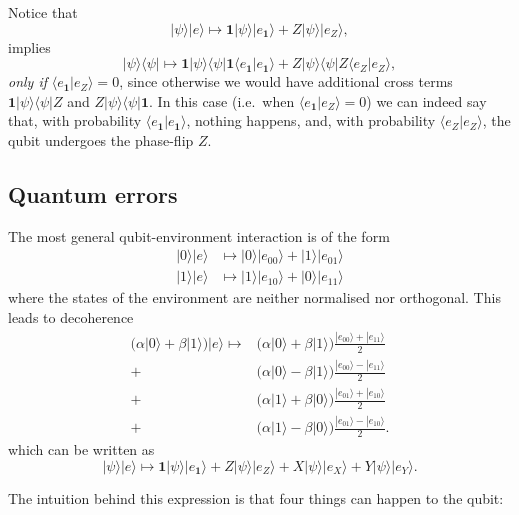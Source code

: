 \documentclass[fleqn]{article}
\begin{document}
Notice that
\[
|\psi\rangle|e\rangle \longmapsto \mathbf{1}|\psi\rangle|e_{\mathbf{1}}\rangle+Z|\psi\rangle|e_Z\rangle,
\]
implies
\[
|\psi\rangle\langle\psi|\longmapsto \mathbf{1}|\psi\rangle\langle\psi| \mathbf{1}\langle e_{\mathbf{1}}|e_{\mathbf{1}}\rangle +Z|\psi\rangle\langle\psi| Z\langle e_Z|e_Z\rangle,
\]
\emph{only if} \(\langle e_{\mathbf{1}}|e_Z\rangle=0\), since otherwise we would have additional cross terms \(\mathbf{1}|\psi\rangle\langle\psi|Z\) and \(Z|\psi\rangle\langle\psi|\mathbf{1}\).
In this case (i.e.~when \(\langle e_{\mathbf{1}}|e_Z\rangle=0\)) we can indeed say that, with probability \(\langle e_{\mathbf{1}}|e_{\mathbf{1}}\rangle\), nothing happens, and, with probability \(\langle e_Z|e_Z\rangle\), the qubit undergoes the phase-flip \(Z\).

\hypertarget{quantum-errors}{%
\subsection{Quantum errors}\label{quantum-errors}}

The most general qubit-environment interaction is of the form
\[
  \begin{aligned}
    |0\rangle|e\rangle &\longmapsto |0\rangle|e_{00}\rangle + |1\rangle|e_{01}\rangle
  \\|1\rangle|e\rangle &\longmapsto |1\rangle|e_{10}\rangle + |0\rangle|e_{11}\rangle
  \end{aligned}
\]
where the states of the environment are neither normalised nor orthogonal.
This leads to decoherence
\[
  \begin{aligned}
    \Big( \alpha|0\rangle + \beta|1\rangle \Big) |e\rangle \longmapsto
    & \Big( \alpha|0\rangle + \beta|1\rangle \Big) \frac{|e_{00}\rangle+|e_{11}\rangle}{2}
  \\+& \Big( \alpha|0\rangle - \beta|1\rangle \Big) \frac{|e_{00}\rangle-|e_{11}\rangle}{2}
  \\+& \Big( \alpha|1\rangle + \beta|0\rangle \Big) \frac{|e_{01}\rangle+|e_{10}\rangle}{2}
  \\+& \Big( \alpha|1\rangle - \beta|0\rangle \Big) \frac{|e_{01}\rangle-|e_{10}\rangle}{2}.
  \end{aligned}
\]
which can be written as
\[
|\psi\rangle|e\rangle \longmapsto  \mathbf{1}|\psi\rangle|e_{\mathbf{1}}\rangle + Z|\psi\rangle |e_Z\rangle +X|\psi\rangle |e_X\rangle + Y|\psi\rangle |e_Y\rangle.
\]

The intuition behind this expression is that four things can happen to the qubit:
\end{document}
